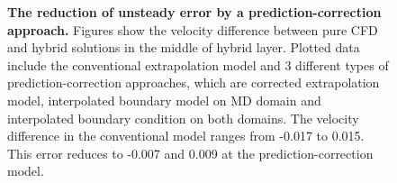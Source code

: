 \documentclass[preprint,12pt]{elsarticle}
\begin{document}
\begin{figure}
\centering
{}
\hskip 1cm
\vskip-0.2cm
\hskip 1cm
\caption[]{\small {\bf The reduction of unsteady error by a prediction-correction approach.} Figures show the velocity difference between pure CFD and hybrid solutions in the middle of hybrid layer. Plotted data include the conventional extrapolation model and 3 different types of prediction-correction approaches, which are corrected extrapolation model, interpolated boundary model on MD domain and interpolated boundary condition on both domains. The velocity difference in the conventional model ranges from -0.017 to 0.015. This error reduces to -0.007 and 0.009 at the prediction-correction model.}
\label{Temporal2}
\end{figure}
\end{document}
